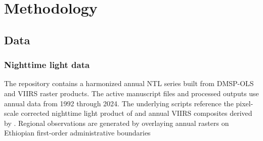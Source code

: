 \documentclass[12pt,a4paper]{article}
\begin{document}
\section{Methodology}
\subsection{Data}
\subsubsection{Nighttime light data}
The repository contains a harmonized annual NTL series built from DMSP-OLS and VIIRS raster products. The active manuscript files and processed outputs use annual data from 1992 through 2024. The underlying scripts reference the pixel-scale corrected nighttime light product of \citet{Li2023} and annual VIIRS composites derived by \citet{Elvidge2021}. Regional observations are generated by overlaying annual rasters on Ethiopian first-order administrative boundaries
\end{document}

